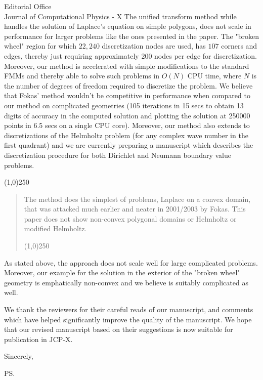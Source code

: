 \documentclass[11pt]{letter}
\newcommand\qa{\begin{center}\line(1,0){250}\end{center}\begin{quote}\begin{em}}
\newcommand\qb{\end{em}\begin{center}\line(1,0){250}\end{center}\end{quote}}
\begin{document}
\begin{letter}{Editorial Office\\
Journal of Computational Physics - X}
The unified transform method while handles the solution of Laplace's equation on simple polygons, does not scale in performance for larger problems like the ones presented in the paper. The "broken wheel" region for which $22,240$ discretization nodes are used, has $107$
corners and edges, thereby just requiring approximately $200$ nodes per edge for discretization. Moreover, our method is accelerated with simple modifications to the standard FMMs and thereby able to solve such problems in $O(N)$ CPU time, where $N$ is the number of degrees of freedom required to discretize the problem. We believe that Fokas' method wouldn't be competitive in performance when compared to our method on complicated geometries (105 iterations in 15 secs to obtain 13 digits of accuracy in the computed solution and plotting the solution at 250000 points in 6.5 secs on a single CPU core).
Moreover, our method also extends to discretizations of the Helmholtz problem (for any complex wave number in the first quadrant) and we are currently preparing a manuscript which describes the discretization procedure for both Dirichlet and Neumann boundary value problems. 
\qa

The method does the simplest of problems, Laplace on a convex domain, that was attacked much earlier and neater in 2001/2003 by Fokas. This paper does not show non-convex polygonal domains or Helmholtz or modified Helmholtz.

\qb

As stated above, the approach does not scale well for large complicated problems. Moreover, our example for the solution in the exterior of the "broken wheel" geometry is emphatically non-convex and we believe is suitably complicated as well. 




We thank the reviewers for their careful reads of our manuscript, and comments 
which have helped significantly improve the quality of the manuscript.
We hope that our revised manuscript based on their suggestions is now
suitable for publication in JCP-X.


\closing{Sincerely,}

\ps


\end{letter}
\end{document}
